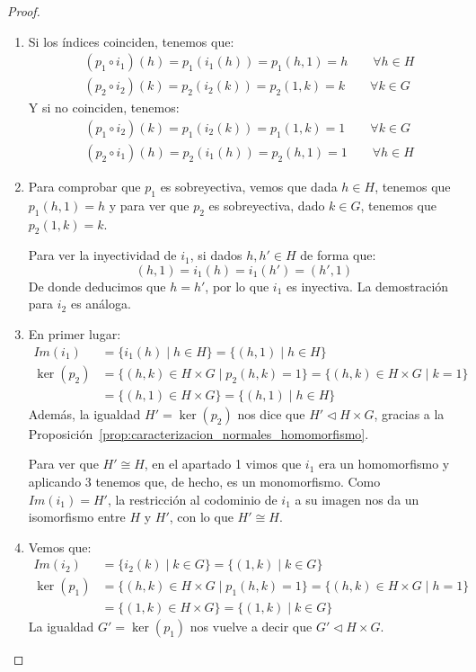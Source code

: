 \begin{prop}
\begin{proof}
\begin{enumerate}
\begin{itemize}
                \end{itemize}
            \item Si los índices coinciden, tenemos que:
                \begin{align*}
                    &(p_1\circ i_1)(h) = p_1(i_1(h)) = p_1(h,1) = h \qquad \forall h\in H \\
                    &(p_2\circ i_2)(k) = p_2(i_2(k)) = p_2(1,k) = k \qquad \forall k\in G 
                \end{align*}
                Y si no coinciden, tenemos:
                \begin{align*}
                    &(p_1\circ i_2)(k) = p_1(i_2(k)) = p_1(1,k) = 1 \qquad \forall k\in G \\
                    &(p_2\circ i_1)(h) = p_2(i_1(h)) = p_2(h,1) = 1 \qquad \forall h\in H
                \end{align*}
            \item Para comprobar que $p_1$ es sobreyectiva, vemos que dada $h\in H$, tenemos que $p_1(h,1) = h$ y para ver que $p_2$ es sobreyectiva, dado $k\in G$, tenemos que $p_2(1,k) = k$.

                Para ver la inyectividad de $i_1$, si dados $h,h'\in H$ de forma que:
                \begin{equation*}
                    (h,1) = i_1(h) = i_1(h') = (h',1)
                \end{equation*}
                De donde deducimos que $h=h'$, por lo que $i_1$ es inyectiva. La demostración para $i_2$ es análoga.
            \item En primer lugar:
                \begin{align*}
                    Im(i_1) &= \{i_1(h) \mid h\in H\} = \{(h,1) \mid h\in H\} \\
                    \ker(p_2) &= \{(h,k)\in H\times G \mid p_2(h,k)=1\} = \{(h,k)\in H\times G \mid k = 1\} \\ &= \{(h,1)\in H\times G\} = \{(h,1)\mid h\in H\}
                \end{align*}
                Además, la igualdad $H' = \ker(p_2)$ nos dice que $H' \lhd H\times G$, gracias a la Proposición~\ref{prop:caracterizacion_normales_homomorfismo}.

            Para ver que $H'\cong H$, en el apartado 1 vimos que $i_1$ era un homomorfismo y aplicando 3 tenemos que, de hecho, es un monomorfismo. Como $Im(i_1) = H'$, la restricción al codominio de $i_1$ a su imagen nos da un isomorfismo entre $H$ y $H'$, con lo que $H'\cong H$.
            \item Vemos que:
                \begin{align*}
                    Im(i_2) &= \{i_2(k) \mid k\in G\} = \{(1,k) \mid k\in G\} \\
                    \ker(p_1) &= \{(h,k)\in H\times G \mid p_1(h,k) = 1\} = \{(h,k)\in H\times G \mid h=1\} \\ &= \{(1,k)\in H\times G\} = \{(1,k)\mid k\in G\}
                \end{align*}
                La igualdad $G' = \ker(p_1)$ nos vuelve a decir que $G' \lhd H\times G$.


\end{enumerate}
\end{proof}
\end{prop}
